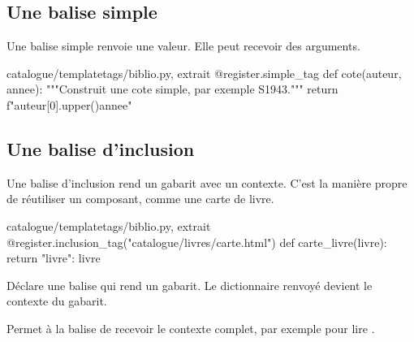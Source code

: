 \subsection{Une balise simple}

Une balise simple renvoie une valeur. Elle peut recevoir des arguments.

\begin{codebox}[python]{catalogue/templatetags/biblio.py, extrait}
@register.simple_tag
def cote(auteur, annee):
    """Construit une cote simple, par exemple S1943."""
    return f"{auteur[0].upper()}{annee}"
\end{codebox}


\subsection{Une balise d'inclusion}

Une balise d'inclusion rend un gabarit avec un contexte. C'est la manière propre
de réutiliser un composant, comme une carte de livre.

\begin{codebox}[python]{catalogue/templatetags/biblio.py, extrait}
@register.inclusion_tag("catalogue/livres/carte.html")
def carte_livre(livre):
    return {"livre": livre}
\end{codebox}



\begin{description}[leftmargin=3.5cm,style=nextline]
  \item[\code{inclusion\_tag}] Déclare une balise qui rend un gabarit. Le
  dictionnaire renvoyé devient le contexte du gabarit.
  \item[\code{takes\_context=True}] Permet à la balise de recevoir le contexte
  complet, par exemple pour lire .
\end{description}

